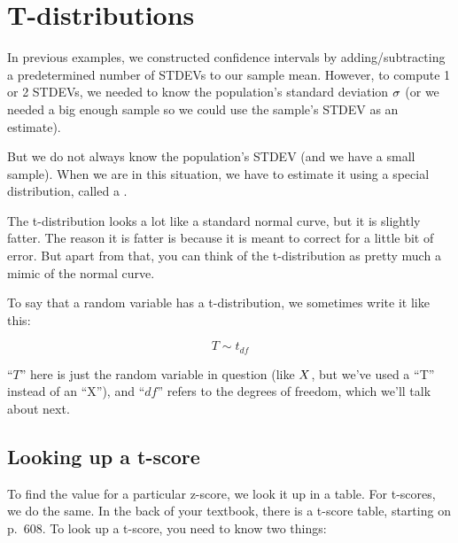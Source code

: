 \documentclass[../../../main.tex]{subfiles}
\begin{document}
\chapter{T-distributions}

In previous examples, we constructed confidence intervals by adding/subtracting a predetermined number of STDEVs to our sample mean. However, to compute 1 or 2 STDEVs, we needed to know the population's standard deviation $\sigma$ (or we needed a big enough sample so we could use the sample's STDEV as an estimate).

But we do not always know the population's STDEV (and we have a small sample). When we are in this situation, we have to estimate it using a special distribution, called a .

The t-distribution looks a lot like a standard normal curve, but it is slightly fatter. The reason it is fatter is because it is meant to correct for a little bit of error. But apart from that, you can think of the t-distribution as pretty much a mimic of the normal curve.

To say that a random variable has a t-distribution, we sometimes write it like this:

\begin{equation*}
  T \sim t_{df}
\end{equation*}

\noindent
``$T$'' here is just the random variable in question (like $\RandVar/$, but we've used a ``T'' instead of an ``X''), and ``$df$'' refers to the degrees of freedom, which we'll talk about next.


\section{Looking up a t-score}

To find the value for a particular z-score, we look it up in a table. For t-scores, we do the same. In the back of your textbook, there is a t-score table, starting on p.~608. To look up a t-score, you need to know two things: 
\end{document}
